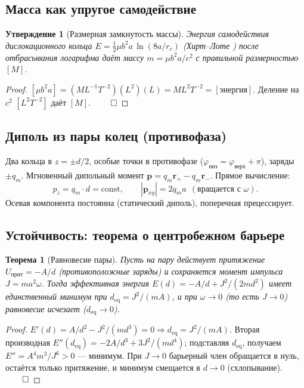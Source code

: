 \documentclass[12pt,a4paper]{article}
\newtheorem{theorem}{Теорема}
\newtheorem{proposition}{Утверждение}
\begin{document}
\subsection{Масса как упругое самодействие}
\begin{proposition}[Размерная замкнутость массы]
Энергия самодействия дислокационного кольца $E=\tfrac12\mu b^2 a\,\ln(8a/r_c)$
(Хирт--Лоте \cite{hirth1982}) после отбрасывания логарифма даёт массу
$m=\mu b^2 a/c^2$ с правильной размерностью $[M]$.
\end{proposition}
\begin{proof}
$[\mu b^2 a]=(ML^{-1}T^{-2})(L^2)(L)=ML^{2}T^{-2}=[\text{энергия}]$. Деление на
$c^2$ $[L^2T^{-2}]$ даёт $[M]$. $\qed$
\end{proof}

\subsection{Диполь из пары колец (противофаза)}
Два кольца в $z=\pm d/2$, особые точки в противофазе ($\varphi_{\text{низ}}=
\varphi_{\text{верх}}+\pi$), заряды $\pm q_m$. Мгновенный дипольный момент
$\mathbf{p}=q_m\mathbf{r}_+ - q_m\mathbf{r}_-$. Прямое вычисление:
\begin{equation}
p_z = q_m\cdot d = \text{const},\qquad
|\mathbf{p}_{xy}| = 2 q_m a\ \ (\text{вращается с }\omega).
\end{equation}
Осевая компонента постоянна (статический диполь), поперечная прецессирует.

\subsection{Устойчивость: теорема о центробежном барьере}
\begin{theorem}[Равновесие пары]
\label{th:stab}
Пусть на пару действует притяжение $U_{\text{прит}}=-A/d$ (противоположные
заряды) и сохраняется момент импульса $J=m a^2\omega$. Тогда эффективная энергия
$E(d)=-A/d+J^2/(2md^2)$ имеет единственный минимум при
$d_{\text{eq}}=J^2/(mA)$, и при $\omega\to0$ (то есть $J\to0$) равновесие
исчезает ($d_{\text{eq}}\to0$).
\end{theorem}
\begin{proof}
$E'(d)=A/d^2-J^2/(md^3)=0 \Rightarrow d_{\text{eq}}=J^2/(mA)$.
Вторая производная $E''(d_{\text{eq}})=-2A/d^3+3J^2/(md^4)$; подставляя
$d_{\text{eq}}$, получаем $E''=A^4 m^3/J^6>0$ --- минимум. При $J\to0$
барьерный член обращается в нуль, остаётся только притяжение, и минимум
смещается в $d\to0$ (схлопывание). $\qed$
\end{proof}
\end{document}
